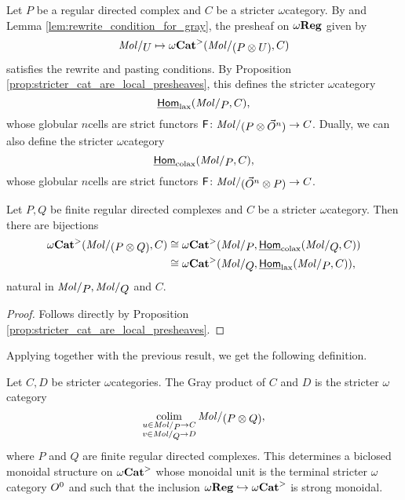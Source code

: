 \begin{dfn} 
    Let \( P \) be a regular directed complex and \( C \) be a stricter \( \omega \)\nbd category.
    By \cite[Lemma 7.2.8]{hadzihasanovic2024combinatorics} and Lemma \ref{lem:rewrite_condition_for_gray}, the presheaf on \( \omega\mathbf{Reg} \) given by
    \begin{equation*}
        \molecin{U} \mapsto \somegaCat(\molecin{(P \gray U)}, C) 
    \end{equation*}
    satisfies the rewrite and pasting conditions.
    By Proposition \ref{prop:stricter_cat_are_local_presheaves}, this defines the stricter \( \omega \)\nbd category 
    \begin{equation*}
        \homlax(\molecin{P}, C),
    \end{equation*}
    whose globular \( n \)\nbd cells are strict functors \( \F \colon \molecin{(P \gray \dglobe{n})} \to C \).
    Dually, we can also define the stricter \( \omega \)\nbd category
    \begin{equation*}
        \homcolax(\molecin{P}, C),
    \end{equation*}
    whose globular \( n \)\nbd cells are strict functors \( \F \colon \molecin{(\dglobe{n} \gray P)} \to C \).
\end{dfn}

\begin{lem}
    Let \( P, Q \) be finite regular directed complexes and \( C \) be a stricter \( \omega \)\nbd category.
    Then there are bijections
    \begin{align*}
        \somegaCat(\molecin{(P \gray Q)}, C) &\cong \somegaCat(\molecin{P}, \homcolax(\molecin{Q}, C)) \\
                                             &\cong \somegaCat(\molecin{Q}, \homlax(\molecin{P}, C)),
    \end{align*}
    natural in \( \molecin{P}, \molecin{Q} \) and \( C \).
\end{lem}
\begin{proof}
    Follows directly by Proposition \ref{prop:stricter_cat_are_local_presheaves}.
\end{proof}

\noindent Applying \cite[Th\'eor\`eme 5.3]{ara2020joint} together with the previous result, we get the following definition.
\begin{dfn}  \label{dfn:gray_product_stricter_categories} 
    Let \( C, D \) be stricter \( \omega \)\nbd categories.
    The Gray product of \( C \) and \( D \) is the stricter \( \omega \)\nbd category
    \begin{equation*}
        \colim_{\substack{u \in \molecin{P} \to C \\ v \in\molecin{Q} \to D}} \molecin{(P \gray Q)},
    \end{equation*}
    where \( P \) and \( Q \) are finite regular directed complexes.
    This determines a biclosed monoidal structure on \( {\omega\mathbf{Cat}}^> \) whose monoidal unit is the terminal stricter \( \omega \)\nbd category \( O^{0} \) and such that the inclusion \( \omega\mathbf{Reg} \hookrightarrow {\omega\mathbf{Cat}}^> \) is strong monoidal.
\end{dfn}

